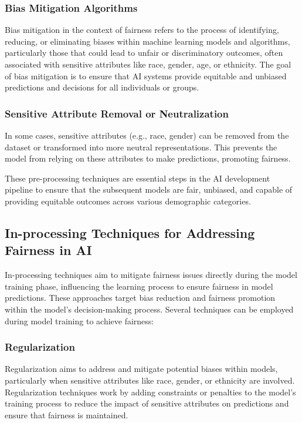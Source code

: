 \documentclass[12pt,a4paper,openright,twoside]{book}
\begin{document}
\subsubsection{Bias Mitigation Algorithms}
Bias mitigation in the context of fairness refers to the process of identifying, reducing, or eliminating biases within machine learning models and algorithms, particularly those that could lead to unfair or discriminatory outcomes, often associated with sensitive attributes like race, gender, age, or ethnicity. The goal of bias mitigation is to ensure that AI systems provide equitable and unbiased predictions and decisions for all individuals or groups.

\subsubsection{Sensitive Attribute Removal or Neutralization}
In some cases, sensitive attributes (e.g., race, gender) can be removed from the dataset or transformed into more neutral representations. This prevents the model from relying on these attributes to make predictions, promoting fairness. \cite{NEURIPS2021_64ff7983}


These pre-processing techniques are essential steps in the AI development pipeline to ensure that the subsequent models are fair, unbiased, and capable of providing equitable outcomes across various demographic categories.

\subsection{In-processing Techniques for Addressing Fairness in AI}

In-processing techniques aim to mitigate fairness issues directly during the model training phase, influencing the learning process to ensure fairness in model predictions. These approaches target bias reduction and fairness promotion within the model's decision-making process. Several techniques can be employed during model training to achieve fairness:

\subsubsection{Regularization}
Regularization  aims to address and mitigate potential biases within models, particularly when sensitive attributes like race, gender, or ethnicity are involved. Regularization techniques work by adding constraints or penalties to the model's training process to reduce the impact of sensitive attributes on predictions and ensure that fairness is maintained. \cite{6137441}
\end{document}
